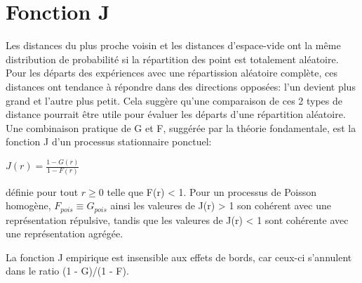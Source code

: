 \documentclass[french,12pt,a4paper]{report}
\begin{document}
\section{Fonction J}

Les distances du plus proche voisin et les distances d'espace-vide ont la même distribution de probabilité si la répartition des point est totalement aléatoire. Pour les départs des expériences avec une répartission aléatoire complète, ces distances ont tendance à répondre dans des directions opposées: l'un devient plus grand et l'autre plus petit. Cela suggère qu'une comparaison de ces 2 types de distance pourrait être utile pour évaluer les départs d'une répartition aléatoire.\\

Une combinaison pratique de G et F, suggérée par la théorie fondamentale, est la fonction J d'un processus stationnaire ponctuel:
\begin{center}\begin{math} J(r) = \frac{1-G(r)}{1-F(r)} \end{math}\end{center}
définie pour tout \begin{math} r \geq 0 \end{math} telle que F(r) < 1. Pour un processus de Poisson homogène, \begin{math} F_{pois} \equiv G_{pois} \end{math} ainsi les valeures de J(r) > 1 son cohérent avec une représentation répulsive, tandis que les valeures de J(r) < 1 sont cohérente avec une représentation agrégée.

La fonction J empirique est insensible aux effets de bords, car ceux-ci s'annulent dans le ratio (1 - G)/(1 - F).

\end{document}
